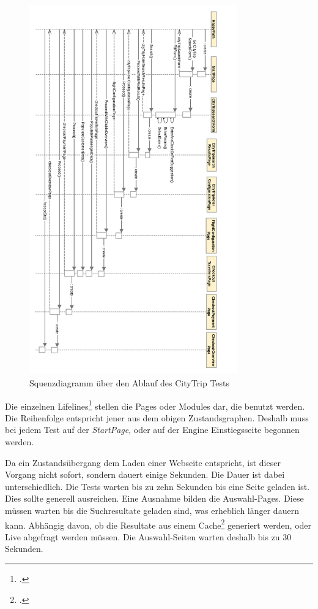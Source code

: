 \begin{figure}[H]
	\centering
	\includegraphics[width=0.8\textwidth]{images/Semesterarbeit - Sequenzdiagramm - HappyPath CityTrip - Portrait.png}
	\caption{Squenzdiagramm über den Ablauf des CityTrip Tests}
	\label{fig:umsetzung:zustandsgraph:sequenz}
\end{figure}

Die einzelnen Lifelines\footcite{sequence_diagram} stellen die Pages oder Modules dar, die benutzt werden. Die Reihenfolge entspricht jener aus dem obigen Zustandsgraphen. Deshalb muss bei jedem Test auf der \textit{StartPage}, oder auf der Engine Einstiegsseite begonnen werden.

Da ein Zustandsübergang dem Laden einer Webseite entspricht, ist dieser Vorgang nicht sofort, sondern dauert einige Sekunden. Die Dauer ist dabei unterschiedlich. Die Tests warten bis zu zehn Sekunden bis eine Seite geladen ist. Dies sollte generell ausreichen. Eine Ausnahme bilden die Auswahl-Pages. Diese müssen warten bis die Suchresultate geladen sind, was erheblich länger dauern kann. Abhängig davon, ob die Resultate aus einem Cache\footcite{Cache} generiert werden, oder Live abgefragt werden müssen. Die Auswahl-Seiten warten deshalb bis zu 30 Sekunden.

